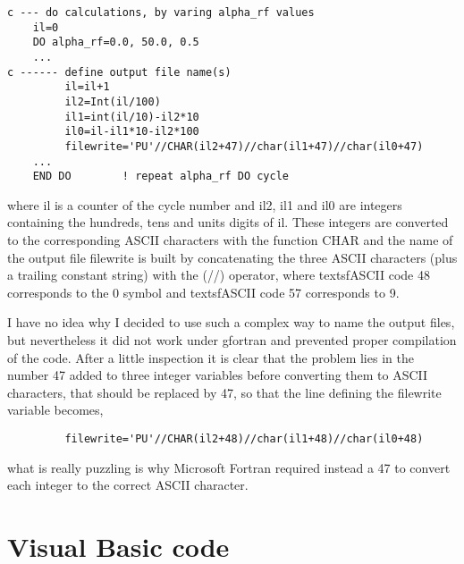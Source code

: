 \begin{lstlisting}
c --- do calculations, by varing alpha_rf values
	il=0
	DO alpha_rf=0.0, 50.0, 0.5
	...
c ------ define output file name(s)
         il=il+1
         il2=Int(il/100)
         il1=int(il/10)-il2*10
         il0=il-il1*10-il2*100
         filewrite='PU'//CHAR(il2+47)//char(il1+47)//char(il0+47)
	...
	END DO        ! repeat alpha_rf DO cycle

\end{lstlisting}

where \textsf{il} is a counter of the cycle number and \textsf{il2}, \textsf{il1} and \textsf{il0} are  integers containing the hundreds, tens and units digits of \textsf{il}. These integers are converted to the corresponding \textsf{ASCII} characters with the function \textsf{CHAR} and the name of the output file \textsf{filewrite} is built by concatenating the three \textsf{ASCII} characters (plus a trailing constant string) with the \textsf(//) operator, where textsf{ASCII} code 48 corresponds to the \textsf{0} symbol and textsf{ASCII} code 57 corresponds to \textsf{9}.

I have no idea why I decided to use such a complex way to name the output files, but nevertheless it did not work under \textsf{gfortran} and prevented proper compilation of the code. After a little inspection it is clear that the problem lies in the number \textsf{47} added to three integer variables before converting them to \textsf{ASCII} characters, that should be replaced by \textsf{47}, so that the line defining the \textsf{filewrite} variable becomes,

\begin{lstlisting}
         filewrite='PU'//CHAR(il2+48)//char(il1+48)//char(il0+48)
\end{lstlisting}

what is really puzzling is why Microsoft Fortran required instead a \textsf{47} to convert each integer to the correct \textsf{ASCII} character.



\section{Visual Basic code}
\label{visual-basic-code}

